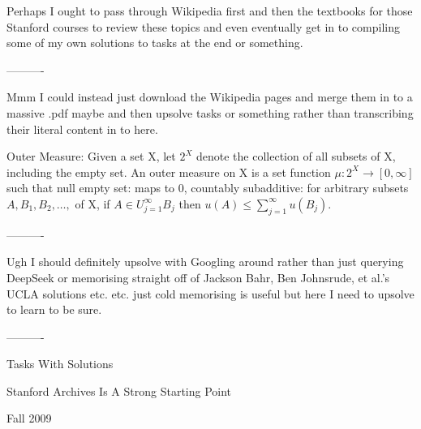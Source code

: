 Perhaps I ought to pass through Wikipedia first and then the textbooks for those Stanford courses to review these topics and even eventually get in to compiling some of my own solutions to tasks at the end or something.

----------

Mmm I could instead just download the Wikipedia pages and merge them in to a massive .pdf maybe and then upsolve tasks or something rather than transcribing their literal content in to here.

Outer Measure: Given a set X, let $2^X$ denote the collection of all subsets of X, including the empty set. An outer measure on X is a set function $\mu: 2^X \to [0,\infty]$ such that null empty set: maps to $0$, countably subadditive: for arbitrary subsets $A, B_1, B_2,\dots,$ of X, if $A \in U_{j=1}^{\infty} B_j$ then $u(A) \le \sum_{j=1}^{\infty} u(B_j)$.

----------

Ugh I should definitely upsolve with Googling around rather than just querying DeepSeek or memorising straight off of Jackson Bahr, Ben Johnsrude, et al.'s UCLA solutions etc. etc. just cold memorising is useful but here I need to upsolve to learn to be sure.

----------

Tasks With Solutions

Stanford Archives Is A Strong Starting Point

Fall 2009

